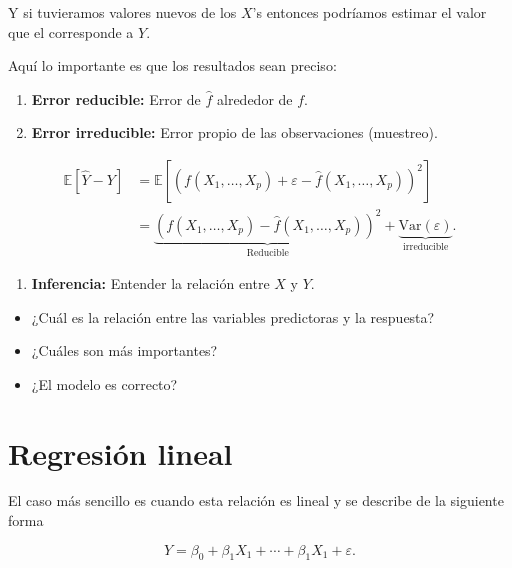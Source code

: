 \documentclass[
  12pt,
]{book}
\providecommand{\tightlist}{%
  \setlength{\itemsep}{0pt}\setlength{\parskip}{0pt}}
\theoremstyle{definition}
\theoremstyle{definition}
\theoremstyle{definition}
\theoremstyle{remark}
\begin{document}
Y si tuvieramos valores nuevos de los \(X\)'s entonces podríamos estimar el valor que el corresponde a \(Y\).

Aquí lo importante es que los resultados sean preciso:

\begin{enumerate}
\def\labelenumi{\alph{enumi}.}
\tightlist
\item
  \textbf{Error reducible:} Error de \(\hat{f}\) alrededor de \(f\).
\item
  \textbf{Error irreducible:} Error propio de las observaciones (muestreo).
\end{enumerate}

\begin{align*}
\mathbb{E}\left[\hat{Y}-Y\right] 
&=  \mathbb{E}\left[\left(  f(X_{1},\ldots,X_{p}) + \varepsilon - \hat{f}(X_{1},\ldots,X_{p}) \right)^{2}  \right] \\
&= \underbrace{\left( f(X_{1},\ldots,X_{p})- \hat{f}(X_{1},\ldots,X_{p})  \right) ^{2} }_{\text{Reducible}}
+\underbrace{\mathrm{Var}\left(\varepsilon\right)}_{\text{irreducible}}. 
\end{align*}

\begin{enumerate}
\def\labelenumi{\arabic{enumi}.}
\setcounter{enumi}{1}
\tightlist
\item
  \textbf{Inferencia:} Entender la relación entre \(X\) y \(Y\).
\end{enumerate}

\begin{itemize}
\tightlist
\item
  ¿Cuál es la relación entre las variables predictoras y la respuesta?
\item
  ¿Cuáles son más importantes?
\item
  ¿El modelo es correcto?
\end{itemize}

\hypertarget{regresiuxf3n-lineal}{%
\section{Regresión lineal}\label{regresiuxf3n-lineal}}

El caso más sencillo es cuando esta relación es lineal y se describe de la siguiente forma

\begin{equation*}
Y = \beta_{0} + \beta_{1}X_{1} + \cdots +  \beta_{1}X_{1} + \varepsilon.
\end{equation*}
\end{document}
